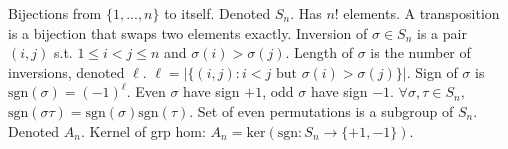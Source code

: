  Bijections from $\{1, ..., n\}$ to itself.
Denoted $S_n$.
Has $n!$ elements.
A transposition is a bijection that swaps two elements exactly.
 Inversion of $\sigma \in S_n$ is a pair $(i, j)$
s.t. $1 \le i < j \le n$ and $\sigma(i) > \sigma(j)$.
Length of $\sigma$ is the number of inversions, denoted $\ell$.
$\ell = |\{(i, j) : i < j \text{ but } \sigma(i) > \sigma(j)\}|$.
Sign of $\sigma$ is $\text{sgn}(\sigma) = (-1)^{\ell}$.
Even $\sigma$ have sign $+1$, odd $\sigma$ have sign $-1$.
$\forall \sigma, \tau \in S_n$, $\text{sgn}(\sigma \tau) = \text{sgn}(\sigma) \text{sgn}(\tau)$.
Set of even permutations is a subgroup of $S_n$.
Denoted $A_n$.
Kernel of grp hom: $A_n = \text{ker}(\text{sgn} : S_n \to \{+1, -1\})$.
